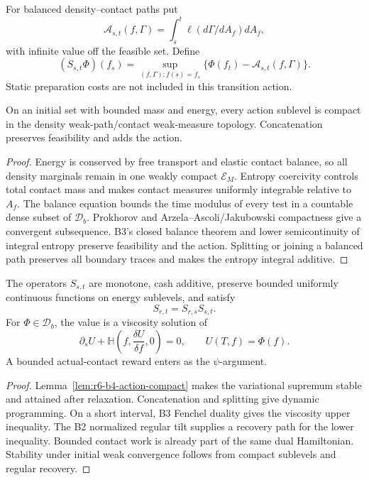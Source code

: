 For balanced density--contact paths put
\[
\mathcal A_{s,t}(f,\Gamma)=
\int_s^t\ell(d\Gamma/dA_f)dA_f,
\]
with infinite value off the feasible set.  Define
\[
(S_{s,t}\Phi)(f_s)=
\sup_{(f,\Gamma):f(s)=f_s}
\{\Phi(f_t)-\mathcal A_{s,t}(f,\Gamma)\}.
\]
Static preparation costs are not included in this transition action.

\begin{lemma}
\label{lem:r6-b4-action-compact}
On an initial set with bounded mass and energy, every action sublevel is
compact in the density weak-path/contact weak-measure topology.  Concatenation
preserves feasibility and adds the action.
\end{lemma}

\begin{proof}
Energy is conserved by free transport and elastic contact balance, so all
density marginals remain in one weakly compact \(\mathcal E_M\).  Entropy
coercivity controls total contact mass and makes contact measures uniformly
integrable relative to \(A_f\).  The balance equation bounds the time modulus
of every test in a countable dense subset of \(\mathscr D_b\).  Prokhorov and
Arzela--Ascoli/Jakubowski compactness give a convergent subsequence.  B3's
closed balance theorem and lower semicontinuity of integral entropy preserve
feasibility and the action.  Splitting or joining a balanced path preserves
all boundary traces and makes the entropy integral additive.
\end{proof}

\begin{theorem}
\label{thm:r6-b4-semigroup}
The operators \(S_{s,t}\) are monotone, cash additive, preserve bounded
uniformly continuous functions on energy sublevels, and satisfy
\[
S_{r,t}=S_{r,s}S_{s,t}.
\]
For \(\Phi\in\mathscr D_b\), the value is a viscosity solution of
\[
\partial_sU+
\mathbb H\left(f,\frac{\delta U}{\delta f},0\right)=0,
\qquad U(T,f)=\Phi(f).
\]
A bounded actual-contact reward enters as the \(\psi\)-argument.
\end{theorem}

\begin{proof}
Lemma~\ref{lem:r6-b4-action-compact} makes the variational supremum stable and
attained after relaxation.  Concatenation and splitting give dynamic
programming.  On a short interval, B3 Fenchel duality gives the viscosity upper
inequality.  The B2 normalized regular tilt supplies a recovery path for the
lower inequality.  Bounded contact work is already part of the same dual
Hamiltonian.  Stability under initial weak convergence follows from compact
sublevels and regular recovery.
\end{proof}

